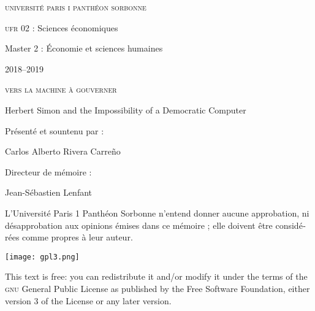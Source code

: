 \begin{titlepage}
 \centering
\begin{french}
 {\large \textsc{université paris i panthéon sorbonne} \par}
  \vspace*{0.01\textheight}
 {\large \textsc{ufr} 02 : Sciences économiques  \par}
  \vspace*{0.01\textheight}
 {\large Master 2 : Économie et sciences humaines \par}
  \vspace*{0.01\textheight}
 {\large 2018--2019 \par}
\end{french}
  \vspace*{0.3\textheight}
 {\huge \textsc{vers la machine à gouverner}  \par}
  \vspace*{0.02\textheight}
 {\Large Herbert Simon and the Impossibility of a Democratic Computer \par}
\vfill
\begin{french}
 {\large Présenté et sountenu par : \par}
\end{french}
 {\Large Carlos Alberto Rivera Carreño \par}
  \vspace*{0.05\textheight}
\begin{french}
 {\large Directeur de mémoire : \par}
\end{french}
 {\Large Jean-Sébastien Lenfant \par}
\end{titlepage}

\pagestyle{empty}

\begin{french}
L'Université Paris 1 Panthéon Sorbonne n'entend donner aucune approbation,
ni désapprobation aux opinions émises dans ce mémoire ; elle doivent être
considérées comme propres à leur auteur. 
\end{french}
\vfill

\newpage
\vspace*{\fill}
\noindent
\texttt{[image: gpl3.png]}\par
\vspace{1\baselineskip}
This text is free: you can redistribute it and/or modify it
under the terms of the \textsc{gnu} General Public License as published by
the Free Software Foundation, either version 3 of the License or any later
version.

